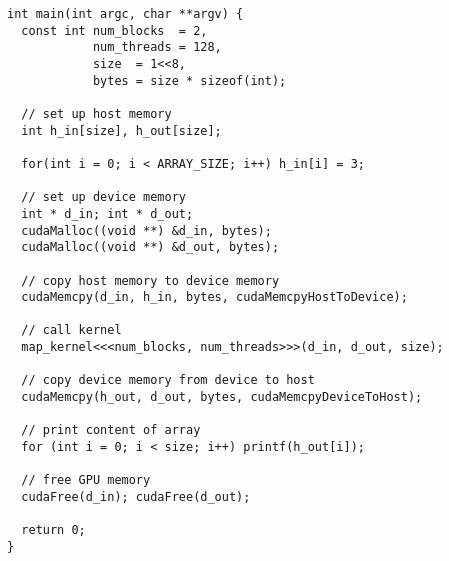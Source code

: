 \begin{lstlisting}[caption={Calling a kernel}, label={lst:kernel call example}]
int main(int argc, char **argv) {
  const int num_blocks  = 2, 
            num_threads = 128, 
            size  = 1<<8,
            bytes = size * sizeof(int);

  // set up host memory
  int h_in[size], h_out[size];

  for(int i = 0; i < ARRAY_SIZE; i++) h_in[i] = 3;

  // set up device memory
  int * d_in; int * d_out;
  cudaMalloc((void **) &d_in, bytes);
  cudaMalloc((void **) &d_out, bytes);

  // copy host memory to device memory
  cudaMemcpy(d_in, h_in, bytes, cudaMemcpyHostToDevice);

  // call kernel
  map_kernel<<<num_blocks, num_threads>>>(d_in, d_out, size);

  // copy device memory from device to host
  cudaMemcpy(h_out, d_out, bytes, cudaMemcpyDeviceToHost);

  // print content of array
  for (int i = 0; i < size; i++) printf(h_out[i]);

  // free GPU memory
  cudaFree(d_in); cudaFree(d_out);

  return 0;
}
\end{lstlisting}

